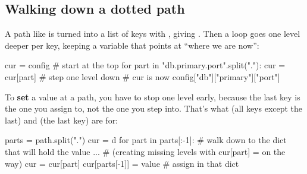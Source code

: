 \documentclass[10pt,a4paper]{article}
\begin{document}
\subsection{Walking down a dotted path}
A path like  is turned into a list of keys with , giving . Then a loop goes one level deeper per key, keeping a variable that points at “where we are now”:
\begin{pycode}
cur = config                     # start at the top
for part in "db.primary.port".split("."):
    cur = cur[part]              # step one level down
# cur is now config["db"]["primary"]["port"]
\end{pycode}
To \textbf{set} a value at a path, you have to stop one level early, because the last key is the one you assign to, not the one you step into. That’s what  (all keys except the last) and  (the last key) are for:
\begin{pycode}
parts = path.split(".")
cur = d
for part in parts[:-1]:          # walk down to the dict that will hold the value
    ...                          # (creating missing levels with cur[part] = {} on the way)
    cur = cur[part]
cur[parts[-1]] = value           # assign in that dict
\end{pycode}
\end{document}
